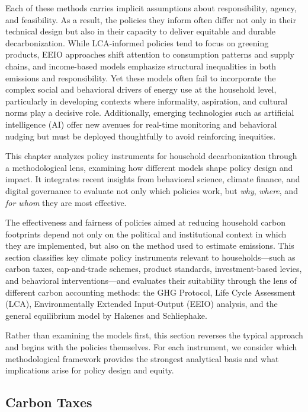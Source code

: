 \documentclass[12pt,a4paper]{article}%
\begin{document}
Each of these methods carries implicit assumptions about responsibility, agency, and feasibility. As a result, the policies they inform often differ not only in their technical design but also in their capacity to deliver equitable and durable decarbonization. While LCA-informed policies tend to focus on greening products, EEIO approaches shift attention to consumption patterns and supply chains, and income-based models emphasize structural inequalities in both emissions and responsibility. Yet these models often fail to incorporate the complex social and behavioral drivers of energy use at the household level, particularly in developing contexts where informality, aspiration, and cultural norms play a decisive role. Additionally, emerging technologies such as artificial intelligence (AI) offer new avenues for real-time monitoring and behavioral nudging but must be deployed thoughtfully to avoid reinforcing inequities.

This chapter analyzes policy instruments for household decarbonization through a methodological lens, examining how different models shape policy design and impact. It integrates recent insights from behavioral science, climate finance, and digital governance to evaluate not only which policies work, but \emph{why}, \emph{where}, and \emph{for whom} they are most effective.

The effectiveness and fairness of policies aimed at reducing household carbon footprints depend not only on the political and institutional context in which they are implemented, but also on the method used to estimate emissions. This section classifies key climate policy instruments relevant to households—such as carbon taxes, cap-and-trade schemes, product standards, investment-based levies, and behavioral interventions—and evaluates their suitability through the lens of different carbon accounting methods: the GHG Protocol, Life Cycle Assessment (LCA), Environmentally Extended Input-Output (EEIO) analysis, and the general equilibrium model by Hakenes and Schliephake.

Rather than examining the models first, this section reverses the typical approach and begins with the policies themselves. For each instrument, we consider which methodological framework provides the strongest analytical basis and what implications arise for policy design and equity.

\subsection{Carbon Taxes}
\end{document}
